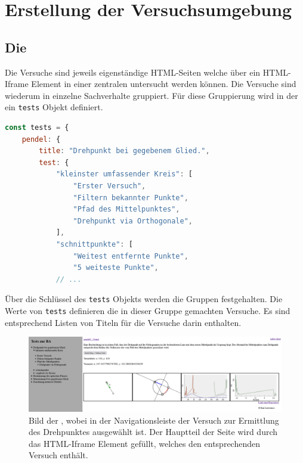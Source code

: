 
\chapter{Erstellung der Versuchsumgebung}


\section{Die }

Die Versuche sind jeweils eigenständige HTML-Seiten welche über ein HTML-Iframe Element in einer zentralen  untersucht werden können.
Die Versuche sind wiederum in einzelne Sachverhalte gruppiert.
Für diese Gruppierung wird in der  ein \lstinline{tests} Objekt definiert.

\begin{lstlisting}[language=JavaScript, caption={Ausschnitt der Definition des \lstinline{tests} Objekts in der \name{index.html}.}, label={lst:tests_objekt}]
const tests = {
    pendel: {
        title: "Drehpunkt bei gegebenem Glied.",
        test: {
            "kleinster umfassender Kreis": [
                "Erster Versuch",
                "Filtern bekannter Punkte",
                "Pfad des Mittelpunktes",
                "Drehpunkt via Orthogonale",
            ],
            "schnittpunkte": [
                "Weitest entfernte Punkte",
                "5 weiteste Punkte",
            // ...
\end{lstlisting}

Über die Schlüssel des \lstinline{tests} Objekts werden die Gruppen festgehalten.
Die Werte von \lstinline{tests} definieren die in dieser Gruppe gemachten Versuche.
Es sind entsprechend Listen von Titeln für die Versuche darin enthalten.

\begin{figure}
    \includegraphics[width=\textwidth]{gfx/index.png}
    \caption[Bild der ]{Bild der , wobei in der Navigationsleiste der Versuch zur Ermittlung des Drehpunktes ausgewählt ist. Der Hauptteil der Seite wird durch das HTML-Iframe Element gefüllt, welches den entsprechenden Versuch enthält.}\label{fig:index.html}
\end{figure}

